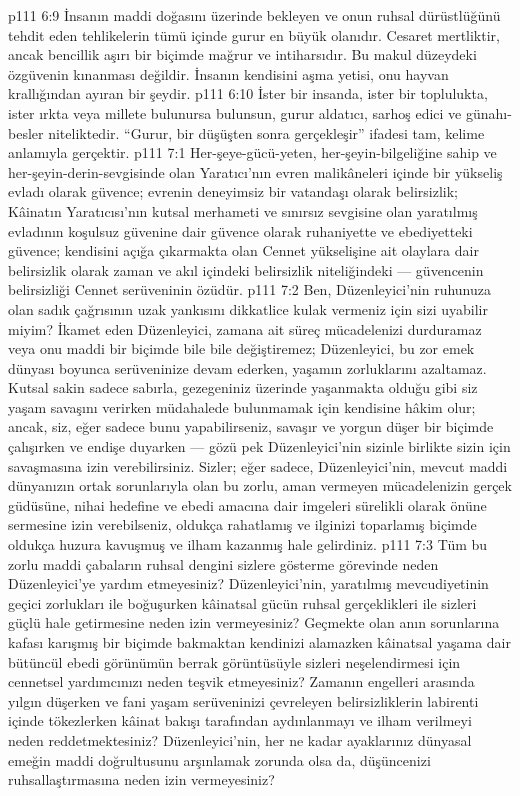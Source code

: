 \vs p111 6:9 İnsanın maddi doğasını üzerinde bekleyen ve onun ruhsal dürüstlüğünü tehdit eden tehlikelerin tümü içinde gurur en büyük olanıdır. Cesaret mertliktir, ancak bencillik aşırı bir biçimde mağrur ve intiharsıdır. Bu makul düzeydeki özgüvenin kınanması değildir. İnsanın kendisini aşma yetisi, onu hayvan krallığından ayıran bir şeydir.
\vs p111 6:10 İster bir insanda, ister bir toplulukta, ister ırkta veya millete bulunursa bulunsun, gurur aldatıcı, sarhoş edici ve günahı\hyp{}besler niteliktedir. “Gurur, bir düşüşten sonra gerçekleşir” ifadesi tam, kelime anlamıyla gerçektir.
\vs p111 7:1 Her\hyp{}şeye\hyp{}gücü\hyp{}yeten, her\hyp{}şeyin\hyp{}bilgeliğine sahip ve her\hyp{}şeyin\hyp{}derin\hyp{}sevgisinde olan Yaratıcı’nın evren malikâneleri içinde bir yükseliş evladı olarak güvence; evrenin deneyimsiz bir vatandaşı olarak belirsizlik; Kâinatın Yaratıcısı’nın kutsal merhameti ve sınırsız sevgisine olan yaratılmış evladının koşulsuz güvenine dair güvence olarak ruhaniyette ve ebediyetteki güvence; kendisini açığa çıkarmakta olan Cennet yükselişine ait olaylara dair belirsizlik olarak zaman ve akıl içindeki belirsizlik niteliğindeki --- güvencenin belirsizliği Cennet serüveninin özüdür.
\vs p111 7:2 Ben, Düzenleyici’nin ruhunuza olan sadık çağrısının uzak yankısını dikkatlice kulak vermeniz için sizi uyabilir miyim? İkamet eden Düzenleyici, zamana ait süreç mücadelenizi durduramaz veya onu maddi bir biçimde bile bile değiştiremez; Düzenleyici, bu zor emek dünyası boyunca serüveninize devam ederken, yaşamın zorluklarını azaltamaz. Kutsal sakin sadece sabırla, gezegeniniz üzerinde yaşanmakta olduğu gibi siz yaşam savaşını verirken müdahalede bulunmamak için kendisine hâkim olur; ancak, siz, eğer sadece bunu yapabilirseniz, savaşır ve yorgun düşer bir biçimde çalışırken ve endişe duyarken --- gözü pek Düzenleyici’nin sizinle birlikte sizin için savaşmasına izin verebilirsiniz. Sizler; eğer sadece, Düzenleyici’nin, mevcut maddi dünyanızın ortak sorunlarıyla olan bu zorlu, aman vermeyen mücadelenizin gerçek güdüsüne, nihai hedefine ve ebedi amacına dair imgeleri sürelikli olarak önüne sermesine izin verebilseniz, oldukça rahatlamış ve ilginizi toparlamış biçimde oldukça huzura kavuşmuş ve ilham kazanmış hale gelirdiniz.
\vs p111 7:3 Tüm bu zorlu maddi çabaların ruhsal dengini sizlere gösterme görevinde neden Düzenleyici’ye yardım etmeyesiniz? Düzenleyici’nin, yaratılmış mevcudiyetinin geçici zorlukları ile boğuşurken kâinatsal gücün ruhsal gerçeklikleri ile sizleri güçlü hale getirmesine neden izin vermeyesiniz? Geçmekte olan anın sorunlarına kafası karışmış bir biçimde bakmaktan kendinizi alamazken kâinatsal yaşama dair bütüncül ebedi görünümün berrak görüntüsüyle sizleri neşelendirmesi için cennetsel yardımcınızı neden teşvik etmeyesiniz? Zamanın engelleri arasında yılgın düşerken ve fani yaşam serüveninizi çevreleyen belirsizliklerin labirenti içinde tökezlerken kâinat bakışı tarafından aydınlanmayı ve ilham verilmeyi neden reddetmektesiniz? Düzenleyici’nin, her ne kadar ayaklarınız dünyasal emeğin maddi doğrultusunu arşınlamak zorunda olsa da, düşüncenizi ruhsallaştırmasına neden izin vermeyesiniz?
